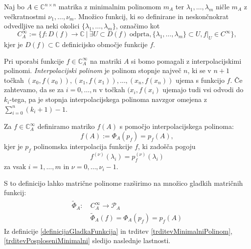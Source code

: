 \documentclass[mat1]{fmfdelo}
\newcommand{\C}{\mathbb C}
\begin{document}
Naj bo $A \in \C^{n\times n}$ matrika z minimalnim polinomom $m_A$ ter $\lambda_1, \ldots, \lambda_m$ ničle $m_A$ z večkratnostmi $\nu_1, \ldots, \nu_m$. Množico funkcij, ki so definirane in neskončnokrat odvedljive na neki okolici $\{\lambda_1, \ldots, \lambda_m\}$, označimo kot
\begin{equation*}
    C_A^\infty := \{ f: D(f) \rightarrow \C\ |\ \exists U \subset D(f)\ \text{odprta}, \{\lambda_1, \ldots, \lambda_m\} \subset U, f|_U \in C^\infty \},
\end{equation*}
kjer je $D(f) \subset \C$ definicijsko območje funkcije $f$.

Pri uporabi funkcije $f \in \C_A^\infty$ na matriki $A$ si bomo pomagali z interpolacijskimi polinomi. \emph{Interpolacijski polinom} je polinom stopnje največ $n$, ki se v $n+1$ točkah $(x_0, f(x_0)), (x_1, f(x_1)), \ldots, (x_n, f(x_n))$ ujema s funkcijo $f$. Če zahtevamo, da se za $i=0, \ldots, n$ v točkah $(x_i, f(x_i)$ ujemajo tudi vsi odvodi do $k_i$-tega, pa je stopnja interpolacijskega polinoma navzgor omejena z $\sum_{i=0}^n (k_i + 1) - 1$.
\begin{definicija} \label{definicijaGladkaFunkcija}
    Za $f \in \C_A^\infty$ definiramo matriko $f(A)$ s pomočjo interpolacijskega polinoma:
    \begin{equation*}
        f(A) := \Phi_A(p_f) = p_f(A),
    \end{equation*}
    kjer je $p_f$ polinomska interpolacija funkcije $f$, ki zadošča pogoju
    \begin{equation*}
        f^{(\nu)}(\lambda_i) = p_f^{(\nu)}(\lambda_i)
    \end{equation*}
    za vsak $i = 1, \ldots, m$ in $\nu = 0, \ldots, \nu_i-1$.
\end{definicija}
S to definicijo lahko matrične polinome razširimo na množico gladkih matričnih funkcij:
\begin{align}
    \begin{split}
        \widetilde{\Phi}_A :\ &C_A^\infty \longrightarrow \mathcal{P}_A \\
        &\widetilde{\Phi}_A(f) = \Phi_A(p_f) = p_f(A)
    \end{split}
\end{align}
Iz definicije \ref{definicijaGladkaFunkcija} in trditev \ref{trditevMinimalniPolinom}, \ref{trditevPosploseniMinimalni} sledijo naslednje lastnosti.
\end{document}
